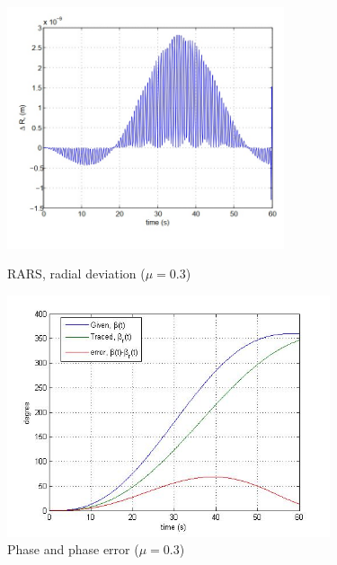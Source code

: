 \begin{figure}
	\begin{minipage}[t]{0.5\textwidth}
		\centering
		\includegraphics[height=2.8in,width=\textwidth]{Chapter4/fig/radialError_mu03}
		\caption{RARS, radial deviation ($\mu=0.3$)}\label{fig:radialErrorMu3}
	\end{minipage}
	\hfill
	\begin{minipage}[t]{0.5\textwidth}
		\centering
		\includegraphics[height=2.8in,width=\textwidth]{Chapter4/fig/phazeError_mu03}
		\caption{Phase and phase error ($\mu=0.3$) }\label{fig:PhazeErrorMu3}
	\end{minipage}
\end{figure}

